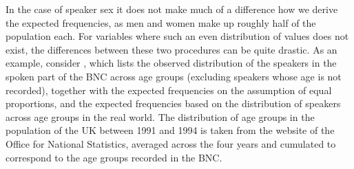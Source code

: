 In the case of speaker sex it does not make much of a difference how we derive the expected  frequencies, as men and women make up roughly half of the population each. For variables where such an even distribution  of values does not exist, the differences between these two procedures can be quite drastic. As an example, consider , which lists the observed distribution of the speakers in the spoken  part of the BNC  across age  groups (excluding speakers whose age  is not recorded), together with the expected  frequencies on the assumption of equal proportions, and the expected frequencies based on the distribution  of speakers across age  groups in the real world. The distribution of age  groups in the population of the UK between 1991 and 1994 is taken from the website of the Office for National Statistics, averaged across the four years and cumulated to correspond to the age  groups recorded in the  BNC.

\begin{table}
\caption{Observed and expected frequencies of Speaker Age in the BNC}
\label{tab:speakerageobsex}
\end{table}

